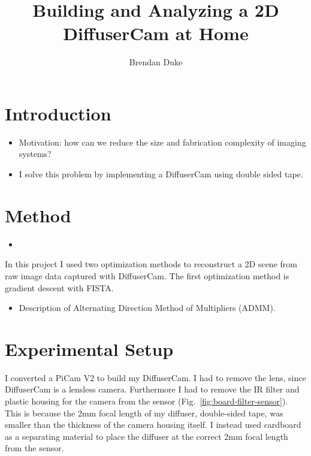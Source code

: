 \documentclass[final]{cvpr}
\begin{document}
\title{Building and Analyzing a 2D DiffuserCam at Home}

\author{Brendan Duke}

\maketitle

\begin{abstract}
\end{abstract}

\section{Introduction}

\begin{itemize}
	\item Motivation: how can we reduce the size and fabrication complexity
	      of imaging systems?

	\item I solve this problem by implementing a DiffuserCam using double
	      sided tape.
\end{itemize}


\section{Method}

\begin{itemize}
	\item
\end{itemize}

In this project I used two optimization methods to reconstruct a 2D scene from
raw image data captured with DiffuserCam.
The first optimization method is gradient descent with FISTA\@.

\begin{itemize}
	\item Description of Alternating Direction Method of Multipliers
	      (ADMM).
\end{itemize}


\section{Experimental Setup}

I converted a PiCam V2 to build my DiffuserCam.
I had to remove the lens, since DiffuserCam is a lensless camera.
Furthermore I had to remove the IR filter and plastic housing for the camera
from the sensor (Fig.~\ref{fig:board-filter-sensor}).
This is because the 2mm focal length of my diffuser,
double-sided tape, was smaller than the thickness of the camera housing itself.
I instead used cardboard as a separating material to place the diffuser at the
correct 2mm focal length from the sensor.
\end{document}
